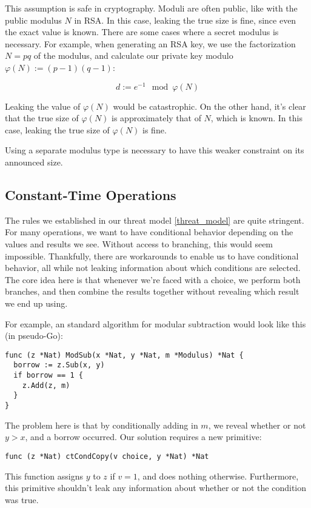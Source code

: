 \documentclass[11pt, a4paper]{article} %
\begin{document}
{This assumption is safe in cryptography. Moduli are often public,
like with the public modulus $N$ in RSA. In this case, leaking
the true size is fine, since even the exact value is known. There
are some cases where a secret modulus is necessary. For example,
when generating an RSA key, we use the factorization $N = pq$ of the modulus,
and calculate our private key modulo $\varphi(N) := (p - 1)(q - 1)$:

$$
d := e^{-1} \mod \varphi(N)
$$

Leaking the value of $\varphi(N)$ would be catastrophic. On the other hand,
it's clear that the true size of $\varphi(N)$ is approximately
that of $N$, which is known. In this case, leaking the true size of
$\varphi(N)$ is fine.

Using a separate modulus type is necessary to have this
weaker constraint on its announced size.

\subsection{Constant-Time Operations}

The rules we established in our threat model \ref{threat_model}
are quite stringent. For many operations, we want to have conditional
behavior depending on the values and results we see. Without access
to branching, this would seem impossible. Thankfully, there are workarounds
to enable us to have conditional behavior, all while not leaking information
about which conditions are selected. The core idea here is that whenever
we're faced with a choice, we perform both branches, and then combine
the results together without revealing which result we end up using.

For example, an standard algorithm for modular subtraction would look
like this (in pseudo-Go):

\begin{verbatim}
func (z *Nat) ModSub(x *Nat, y *Nat, m *Modulus) *Nat {
  borrow := z.Sub(x, y)
  if borrow == 1 {
    z.Add(z, m)
  }
}
\end{verbatim}

The problem here is that by conditionally adding in $m$, we reveal
whether or not $y > x$, and a borrow occurred. Our solution
requires a new primitive:

\begin{verbatim}
func (z *Nat) ctCondCopy(v choice, y *Nat) *Nat
\end{verbatim}

This function assigns $y$ to $z$ if $v = 1$, and does nothing otherwise.
Furthermore, this primitive shouldn't leak any information about
whether or not the condition was true.

}
\end{document}
